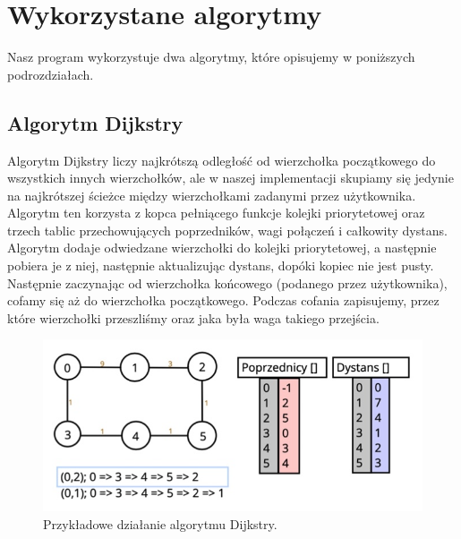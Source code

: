 \documentclass[10pt, a4paper]{report}
\begin{document}
\section{Wykorzystane algorytmy}\label{sec:wykorzystane-algorytmy}
Nasz program wykorzystuje dwa algorytmy, które opisujemy w poniższych
podrozdziałach.

\subsection{Algorytm Dijkstry}\label{subsec:algorytm-dijkstry}
Algorytm Dijkstry liczy najkrótszą odległość od wierzchołka początkowego do
wszystkich innych wierzchołków,
ale w naszej implementacji skupiamy się jedynie na najkrótszej ścieżce między
wierzchołkami zadanymi przez
użytkownika. Algorytm ten korzysta z kopca pełniącego funkcje kolejki
priorytetowej oraz trzech tablic przechowujących
poprzedników, wagi połączeń i całkowity dystans.
Algorytm dodaje odwiedzane wierzchołki do kolejki priorytetowej, a następnie
pobiera je z niej, następnie aktualizując dystans,
dopóki kopiec nie jest pusty. Następnie zaczynając od wierzchołka końcowego
(podanego przez użytkownika), cofamy się aż do wierzchołka początkowego.
Podczas cofania zapisujemy, przez które wierzchołki przeszliśmy oraz jaka była
waga takiego przejścia.
\begin{figure}[h]
  \begin{center}
    \includegraphics[scale=0.5]{dijkstra.png}
    \caption{Przykładowe działanie algorytmu Dijkstry.}
  \end{center}
\end{figure}
\newpage
\end{document}
